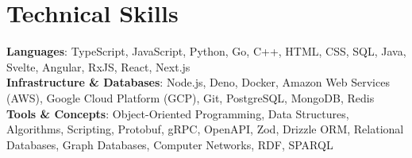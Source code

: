 \documentclass[letterpaper,11pt]{article}
\begin{document}
\section{Technical Skills}
\begin{itemize}[leftmargin=0.15in, label={}]
  \small{\item{
    \textbf{Languages}{: TypeScript, JavaScript, Python, Go, C++, HTML, CSS, SQL, Java, Svelte, Angular, RxJS, React, Next.js} \\
    \textbf{Infrastructure \& Databases}{: Node.js, Deno, Docker, Amazon Web Services (AWS), Google Cloud Platform (GCP), Git, PostgreSQL, MongoDB, Redis} \\
    \textbf{Tools \& Concepts}{: Object-Oriented Programming, Data Structures, Algorithms, Scripting, Protobuf, gRPC, OpenAPI, Zod, Drizzle ORM, Relational Databases, Graph Databases, Computer Networks, RDF, SPARQL}
  }}
\end{itemize}

\end{document}
